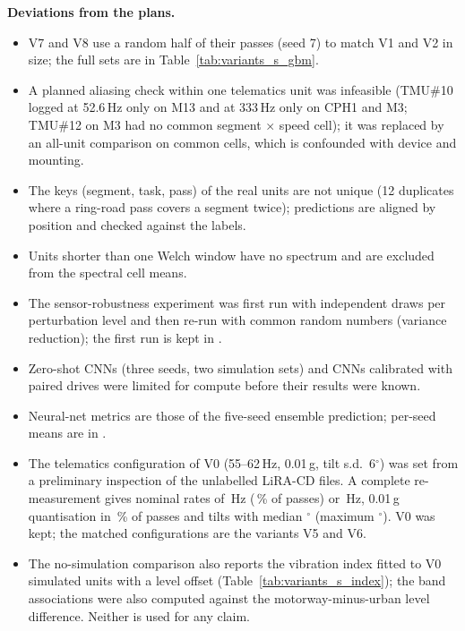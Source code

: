 \documentclass[onecolumn,10pt]{IEEEtran}
\begin{document}
\textbf{Deviations from the plans.}
\begin{itemize}
\item V7 and V8 use a random half of their passes (seed 7) to match V1 and V2 in size; the full sets are in Table~\ref{tab:variants_s_gbm}.
\item A planned aliasing check within one telematics unit was infeasible (TMU\#10 logged at 52.6\,Hz only on M13 and at 333\,Hz only on CPH1 and M3; TMU\#12 on M3 had no common segment $\times$ speed cell); it was replaced by an all-unit comparison on common cells, which is confounded with device and mounting.
\item The keys (segment, task, pass) of the real units are not unique (12 duplicates where a ring-road pass covers a segment twice); predictions are aligned by position and checked against the labels.
\item Units shorter than one Welch window have no spectrum and are excluded from the spectral cell means.
\item The sensor-robustness experiment was first run with independent draws per perturbation level and then re-run with common random numbers (variance reduction); the first run is kept in .
\item Zero-shot CNNs (three seeds, two simulation sets) and CNNs calibrated with paired drives were limited for compute before their results were known.
\item Neural-net metrics are those of the five-seed ensemble prediction; per-seed means are in .
\item The telematics configuration of V0 (55--62\,Hz, 0.01\,g, tilt s.d.\ 6$^\circ$) was set from a preliminary inspection of the unlabelled LiRA-CD files. A complete re-measurement gives nominal rates of \liraRateLow\,Hz (\liraRateLowShare\,\% of passes) or \liraRateHigh\,Hz, 0.01\,g quantisation in \liraLsbShare\,\% of passes and tilts with median \liraTiltMedian$^\circ$ (maximum \liraTiltMax$^\circ$). V0 was kept; the matched configurations are the variants V5 and V6.
\item The no-simulation comparison also reports the vibration index fitted to V0 simulated units with a level offset (Table~\ref{tab:variants_s_index}); the band associations were also computed against the motorway-minus-urban level difference. Neither is used for any claim.
\end{itemize}
\end{document}
